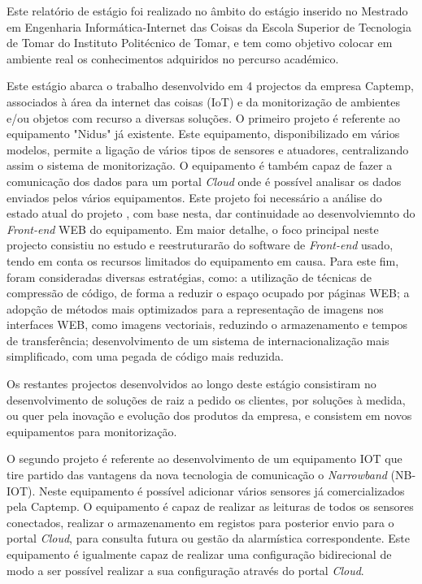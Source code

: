 
\vspace{1cm}
\noindent
\par Este relatório de estágio foi realizado no âmbito do estágio inserido no Mestrado em Engenharia Informática-Internet das Coisas da Escola Superior de Tecnologia de Tomar do Instituto Politécnico de Tomar, e tem como objetivo colocar em ambiente real os conhecimentos adquiridos no percurso académico.

\par Este estágio abarca o trabalho desenvolvido em 4 projectos da empresa Captemp, associados à área da internet das coisas (IoT) e da monitorização de ambientes e/ou objetos com recurso a diversas soluções. O primeiro projeto é referente ao equipamento "Nidus" já existente. Este equipamento, disponibilizado em vários modelos, permite a ligação de vários tipos de sensores e atuadores, centralizando assim o sistema de monitorização. O equipamento é também capaz de fazer a comunicação dos dados para um portal \textit{Cloud} onde é possível analisar os dados enviados pelos vários equipamentos. Este projeto foi necessário a análise do estado atual do projeto , com base nesta, dar continuidade ao desenvolviemnto do \textit{Front-end} WEB do equipamento. Em maior detalhe, o foco principal neste projecto consistiu no estudo e reestruturarão do software de \textit{Front-end} usado, tendo em conta os recursos limitados do equipamento em causa.
Para este fim, foram consideradas diversas estratégias, como: a utilização de técnicas de compressão de código, de forma a reduzir o espaço ocupado por páginas WEB; a adopção de métodos mais optimizados para a representação de imagens nos interfaces WEB, como imagens vectoriais, reduzindo o armazenamento e tempos de transferência; desenvolvimento de um sistema de internacionalização mais simplificado, com uma pegada de código mais reduzida.
\par Os restantes projectos desenvolvidos ao longo deste estágio consistiram no desenvolvimento de soluções de raiz a pedido os clientes, por soluções à medida, ou quer pela inovação e evolução dos produtos da empresa, e consistem em novos equipamentos para monitorização.

\par O segundo projeto é referente ao desenvolvimento de um equipamento IOT que tire partido das vantagens da nova tecnologia de comunicação o \textit{Narrowband} (NB-IOT). Neste equipamento é possível adicionar vários sensores já comercializados pela Captemp. O equipamento é capaz de realizar as leituras de todos os sensores conectados, realizar o armazenamento em registos para posterior envio para o portal \textit{Cloud}, para consulta futura ou gestão da alarmística correspondente. Este equipamento é igualmente capaz de realizar uma configuração bidirecional de modo a ser possível realizar a sua configuração através do portal \textit{Cloud}.

